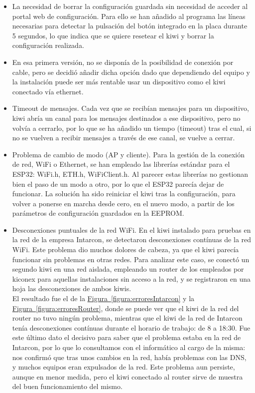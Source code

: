 \begin{itemize}
  \item La necesidad de borrar la configuración guardada sin necesidad de acceder al portal web de configuración. Para ello se han añadido al programa las líneas necesarias para detectar la pulsación del botón integrado en la placa durante 5 segundos, lo que indica que se quiere resetear el kiwi y borrar la configuración realizada.
  \item En esa primera versión, no se disponía de la posibilidad de conexión por cable, pero se decidió añadir dicha opción dado que dependiendo del equipo y la instalación puede ser más rentable usar un dispositivo como el kiwi conectado vía ethernet.
  \item Timeout de mensajes. Cada vez que se recibían mensajes para un dispositivo, kiwi abría un canal para los mensajes destinados a ese dispositivo, pero no volvía a cerrarlo, por lo que se ha añadido un tiempo (timeout) tras el cual, si no se vuelven a recibir mensajes a través de ese canal, se vuelve a cerrar. 
  \item Problema de cambio de modo (AP y cliente). Para la gestión de la conexión de red, WiFi o Ethernet, se han empleado las librerías estándar para el ESP32: WiFi.h, ETH.h, WiFiClient.h. Al parecer estas librerías no gestionan bien el paso de un modo a otro, por lo que el ESP32 parecía dejar de funcionar. La solución ha sido reiniciar el kiwi tras la configuración, para volver a ponerse en marcha desde cero, en el nuevo modo, a partir de los parámetros de configuración guardados en la EEPROM.
  \item Desconexiones puntuales de la red WiFi. En el kiwi instalado para pruebas en la red de la empresa Intarcon, se detectaron desconexiones contínuas de la red WiFi. Este problema dio muchos dolores de cabeza, ya que el kiwi parecía funcionar sin problemas en otras redes. Para analizar este caso, se conectó un segundo kiwi en una red aislada, empleando un router de los empleados por kiconex para aquellas instalaciones sin acceso a la red, y se registraron en una hoja las desconexiones de ambos kiwis. \\ El resultado fue el de la \hyperref[figura:erroresIntarcon]{Figura~\ref{figura:erroresIntarcon}} y la \hyperref[figura:erroresRouter]{Figura~\ref{figura:erroresRouter}}, donde se puede ver que el kiwi de la red del router no tuvo ningún problema, mientras que el kiwi de la red de Intarcon tenía desconexiones contínuas durante el horario de trabajo: de 8 a 18:30. Fue este último dato el decisivo para saber que el problema estaba en la red de Intarcon, por lo que lo consultamos con el informático al cargo de la misma: nos confirmó que tras unos cambios en la red, había problemas con las DNS, y muchos equipos eran expulsados de la red. Este problema aun persiste, aunque en menor medida, pero el kiwi conectado al router sirve de muestra del buen funcionamiento del mismo.
\end{itemize}

